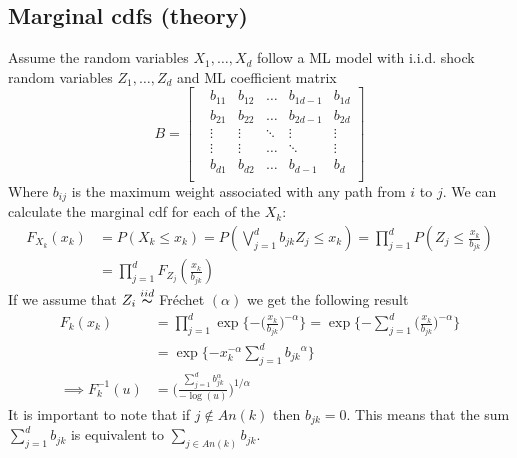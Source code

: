 \documentclass[12pt]{article}
\def\inv{^{-1}}
\newcommand{\ds}{\displaystyle}
\theoremstyle{definition}
\theoremstyle{definition}
\begin{document}
\subsection{Marginal cdfs (theory)}
Assume the random variables $X_1,\hdots, X_d$ follow a ML model with i.i.d. shock random variables $Z_1,\hdots, Z_d$ and ML coefficient matrix 
\[ B=\begin{bmatrix}
&b_{11} &b_{12}&\hdots& b_{1d-1}& b_{1d}\\
&b_{21} &b_{22}&\hdots& b_{2d-1}& b_{2d}\\
&\vdots&\vdots&\ddots & \vdots& \vdots \\
&\vdots&\vdots&\hdots & \ddots& \vdots \\
&b_{d1}& b_{d2} & \hdots &b_{d-1}& b_{d}\\
\end{bmatrix}
\]
Where $b_{ij}$ is the maximum weight associated with any path from $i$ to $j$. We can calculate the marginal cdf for each of the $X_k$:
\begin{align*}
    F_{X_k}(x_k)&=P(X_k\leq x_k)=P(\bigvee_{j=1}^db_{jk}Z_j\leq x_k)=\prod_{j=1}^dP(Z_j\leq \frac{x_k}{b_{jk}})\\
    &=\prod_{j=1}^dF_{Z_j}( \frac{x_k}{b_{jk}})
\end{align*}
If we assume that $Z_i\overset{\tiny{iid}}{\thicksim}$ Fréchet $(\alpha)$ we get the following result
\begin{align*}
    F_{k}(x_k)&=\prod_{j=1}^d\exp\bigg\{{-\big(\frac{x_k}{b_{jk}}}\big)^{-\alpha}\bigg\}=\exp\bigg\{{-\sum_{j=1}^d\big(\frac{x_k}{b_{jk}}}\big)^{-\alpha}\bigg\}\\
    &=\exp\bigg\{{-x_k^{-\alpha}\sum_{j=1}^d{b_{jk}}^{\alpha}}\bigg\}\\
    \implies F_{k}\inv(u)&=\bigg(\frac{\sum_{j=1}^d{b_{jk}^\alpha}}{-\log(u)} \bigg)^{{1}/{\alpha}}
\end{align*}
It is important to note that if $j\notin An(k)$ then $b_{jk}=0$. This means that the sum $\ds \sum_{j=1}^d{b_{jk}}$ is equivalent to $\ds \sum_{j\in An(k)}{b_{jk}}$.
\end{document}
